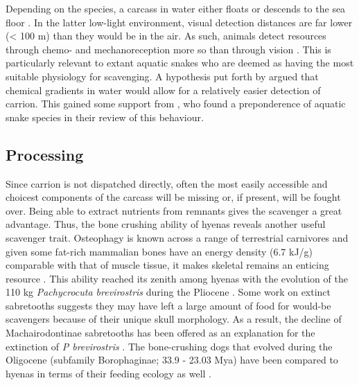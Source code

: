 \documentclass[a4paper,12pt]{article}
\begin{document}

Depending on the species, a carcass in water either floats or descends to the sea floor \citep{Whitehead415}.
In the latter low-light environment, visual detection distances are far lower (< 100 m) than they would be in the air.
As such, animals detect resources through chemo- and mechanoreception more so than through vision \citep{ruxton2004energetic}.
This is particularly relevant to extant aquatic snakes who are deemed as having the most suitable physiology for scavenging.
A hypothesis put forth by \cite{sazima1990necrofagia} argued that chemical gradients in water would allow for a relatively easier detection of carrion.
This gained some support from \cite{devault2002scavenging}, who found a preponderence of aquatic snake species in their review of this behaviour.

\subsection*{Processing}
Since carrion is not dispatched directly, often the most easily accessible and choicest components of the carcass will be missing or, if present, will be fought over.
Being able to extract nutrients from remnants gives the scavenger a great advantage.
Thus, the bone crushing ability of hyenas reveals another useful scavenger trait.
Osteophagy is known across a range of terrestrial carnivores and given some fat-rich mammalian bones have an energy density (6.7 kJ/g) comparable with that of muscle tissue, it makes skeletal remains an enticing resource \citep{brown1989study}.
This ability reached its zenith among hyenas with the evolution of the 110 kg \textit{Pachycrocuta brevirostris} during the Pliocene \citep[3.6 - 2.58 Mya; ][]{palmqvist2011giant}.
Some work on extinct sabretooths suggests they may have left a large amount of food for would-be scavengers because of their unique skull morphology.
As a result, the decline of Machairodontinae sabretooths has been offered as an explanation for the extinction of \textit{P brevirostris} \citep{palmqvist2011giant}.
The bone-crushing dogs that evolved during the Oligocene (subfamily Borophaginae; 33.9 - 23.03 Mya) have been compared to hyenas in terms of their feeding ecology as well \citep{van2003chapter,martin2016pursuit}.
\end{document}
